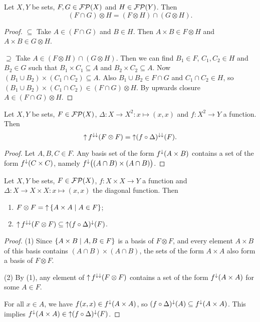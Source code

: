 \begin{lemma} \label{intersectionProductFilters}
Let $X,Y$ be sets, $F,G\in \operatorname{\mathcal{FP}}(X)$ and $H\in\operatorname{\mathcal{FP}}(Y)$. Then
\[ (F\cap G)\otimes H = (F\otimes H)\cap (G\otimes H). \]
\end{lemma}
\begin{proof}
$\boxed{\subseteq}$ Take $A\in (F\cap G)$ and $B\in H$. Then $A\times B\in F\otimes H$ and $A\times B\in G\otimes H$.

$\boxed{\supseteq}$ Take $A \in (F\otimes H)\cap (G\otimes H)$. Then we can find $B_1\in F$, $C_1,C_2\in H$ and $B_2\in G$ such that $B_1\times C_1 \subseteq A$ and $B_2\times C_2 \subseteq A$. Now $(B_1\cup B_2)\times (C_1\cap C_2) \subseteq A$. Also $B_1\cup B_2 \in F\cap G$ and $C_1\cap C_2 \in H$, so $(B_1\cup B_2)\times (C_1\cap C_2) \in (F\cap G)\otimes H$. By upwards closure $A\in (F\cap G)\otimes H$.
\end{proof}

\begin{lemma}
Let $X,Y$ be sets, $F\in\operatorname{\mathcal{FP}}(X)$, $\Delta: X\to X^2: x\mapsto (x,x)$ and $f: X^2\to Y$ a function. Then
\[ \operatorname{\uparrow} f^{\downarrow\downarrow}(F\otimes F) = \operatorname{\uparrow} (f\circ \Delta)^{\downarrow\downarrow}(F). \]
\end{lemma}
\begin{proof}
Let $A,B,C\in F$. Any basis set of the form $f^{\downarrow}(A\times B)$ contains a set of the form $f^\downarrow(C\times C)$, namely $f^{\downarrow}\big((A\cap B)\times (A\cap B)\big)$.
\end{proof}

\begin{lemma} \label{filterPairingLemma}
Let $X, Y$ be sets, $F\in\operatorname{\mathcal{FP}}(X)$, $f: X\times X\to Y$ a function and $\Delta: X \to X\times X: x\mapsto (x, x)$ the diagonal function. Then
\begin{enumerate}
\item $F\otimes F = \upset\setbuilder{A\times A}{A\in F}$;
\item $\operatorname{\uparrow} f^{\downarrow\downarrow}(F\otimes F) \subseteq \operatorname{\uparrow} (f\circ \Delta)^{\downarrow}(F)$.
\end{enumerate}
\end{lemma}
\begin{proof}
(1) Since $\setbuilder{A\times B}{A, B\in F}$ is a basis of $F \otimes F$, and every element $A\times B$ of this basis contains $(A\cap B)\times (A\cap B)$, the sets of the form $A\times A$ also form a basis of $F\otimes F$.

(2) By (1), any element of $\operatorname{\uparrow} f^{\downarrow\downarrow}(F\otimes F)$ contains a set of the form $f^{\downarrow}(A\times A)$ for some $A\in F$.

For all $x\in A$, we have $f(x,x) \in f^{\downarrow}(A\times A)$, so $(f\circ \Delta)^\downarrow(A) \subseteq f^{\downarrow}(A\times A)$. This implies $f^{\downarrow}(A\times A) \in \operatorname{\uparrow} (f\circ \Delta)^{\downarrow}(F)$.
\end{proof}


